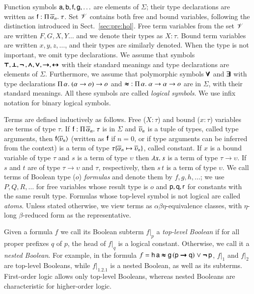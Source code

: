 Function symbols $\mathsf{a}, \mathsf{b}, \mathsf{f}, \mathsf{g}, \ldots$ are elements of
$\Sigma$; their type declarations are written as $\mathsf{f} :
\Pi\,\overline{\alpha}_{n}.\; \tau$. Set $\mathscr{V}$ contains both free and bound variables, following
the distinction introduced in Sect.~\ref{sec:pre:hol}. Free term variables from the set $\mathscr{V}$ are written
$F,G,X,Y \ldots$ and we denote their types as $X : \tau$. Bound term variables are written $x,y,z,\ldots$,
and their types are similarly denoted. When the type is not
important, we omit type declarations. We assume that symbols $\pmb{\top},
\pmb{\bot},\pmb{\neg\,},\pmb{\land}, \pmb{\lor},\pmb{\rightarrow},\pmb{\leftrightarrow}$ with their standard meanings and type declarations are elements of
$\Sigma$. Furthermore, we assume that polymorphic symbols $\pmb{\forall}$ and $\pmb{\exists}$
with type declarations $\Pi\,\alpha.\; (\alpha \rightarrow o) \rightarrow o$
and $\pmb{\approx} \; : \Pi\,\alpha.\; {\alpha \rightarrow \alpha \rightarrow o}$ are
in $\Sigma$, with their standard meanings. All these symbols are called \emph{logical
symbols}. We use infix notation for binary logical symbols.

 Terms are defined inductively as follows. Free ($X : \tau$)  and bound ($x : \tau$) variables   are
terms of type $\tau$. If $\mathsf{f} : \Pi\,\overline{\alpha}_{n}.\; \tau$ is in
$\Sigma$ and $\overline{\upsilon}_{n}$ is a tuple of types, called type arguments, then
$\mathsf{f}{\langle\overline{\upsilon}_{n}\rangle}$ (written as $\mathsf{f}$ if $n=0$, or if type
arguments can be inferred from the context) is a term of type $\tau \{
\overline{\alpha}_{n} \mapsto \overline{\upsilon}_{n} \}$, called constant. If $x$ is a bound variable
of type $\tau$ and $s$ is a term of type $\upsilon$ then $\lambda x.\> s$ is a term of type
$\tau \rightarrow \upsilon$. If $s$ and $t$ are of type $\tau \rightarrow \upsilon$ and
$\tau$, respectively, then $s \, t$ is a term of type $\upsilon$. We call terms of
Boolean type ($o$) \emph{formulas} and denote them by $f,g,h, \ldots$; we use
$P,Q,R, \ldots$ for free variables whose result type is $o$ and
$\mathsf{p},\mathsf{q},\mathsf{r}$ for constants with the same result type.
%
Formulas whose top-level symbol is not logical are called \emph{atoms}.
Unless stated otherwise, we view terms as
$\alpha\beta\eta$-equivalence classes, with $\eta$-long $\beta$-reduced form as
the representative. 

Given a formula $f$ we call its Boolean subterm $f|_p$ a \emph{top-level
Boolean} if for all proper prefixes $q$ of $p$, the head of $f|_q$ is a logical
constant. Otherwise, we call it a \emph{nested Boolean}. For example, in the
formula $f = \mathsf{h} \, \mathsf{a} \pmb{\approx} \mathsf{g} \, (\mathsf{p} \pmb{\rightarrow} \mathsf{q})
\mathrel\lor \pmb{\neg\,}\mathsf{p}$, $f|_1$ and $f|_2$ are top-level Booleans, while
$f|_{1.2.1}$ is a nested Boolean, as well as its subterms. First-order logic
allows only top-level Booleans, whereas nested Booleans are characteristic for
higher-order logic. 

